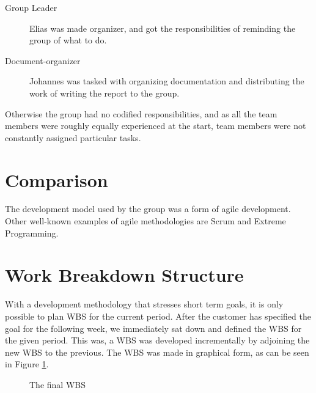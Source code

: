 \begin{description}

\item[Group Leader] Elias was made organizer, and got the responsibilities of reminding the group of what to do.
\item[Document-organizer] Johannes was tasked with organizing documentation and distributing the work of writing the report to the group. 
\end{description}
 
 Otherwise the group had no codified responsibilities, and as all the team members were roughly equally experienced at the start, team members were not constantly assigned particular tasks.
 

\section{Comparison}
The development model used by the group was a form of agile development. Other well-known examples of agile methodologies are Scrum and Extreme Programming.
 
\section{Work Breakdown Structure}
With a development methodology that stresses short term goals, it is only possible to plan WBS for the current period. After the customer has specified the goal for the following week, we immediately sat down and defined the WBS for the given period. This was, a WBS was developed incrementally by adjoining the new WBS to the previous. The WBS was made in graphical form, as can be seen in Figure \ref{fig:WBS}.

\begin{figure}[p]

\setlength\fboxsep{0pt}
\setlength\fboxrule{1pt}\noindent{}

\caption{The final WBS}
\label{fig:WBS}
\end{figure}

